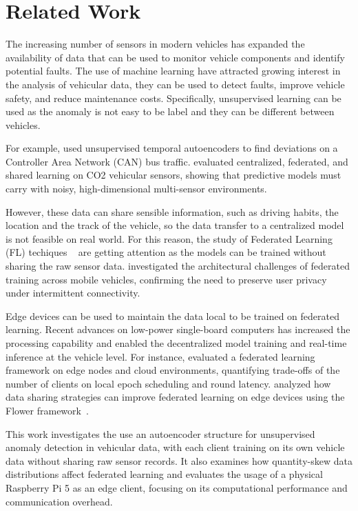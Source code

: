 \documentclass[12pt]{article}
\begin{document}
\section{Related Work}
\label{sec:RelatedWork}
 
 The increasing number of sensors in modern vehicles has expanded the availability of data that can be used to monitor vehicle components and identify potential faults. The use of machine learning have attracted growing interest in the analysis of vehicular data, they can be used to detect faults, improve vehicle safety, and reduce maintenance costs. Specifically, unsupervised learning can be used as the anomaly is not easy to be label and they can be different between vehicles. 
   
 For example, \cite{hanselmann2020canet} used unsupervised temporal autoencoders to find deviations on a Controller Area Network (CAN) bus traffic. \cite{braun2025which} evaluated centralized, federated, and shared learning on CO2 vehicular sensors, showing that predictive models must carry with noisy, high-dimensional multi-sensor environments.
 
 
 However, these data can share sensible information, such as driving habits, the location and the track of the vehicle, so the data transfer to a centralized model is not feasible on real world. For this reason, the study of Federated Learning (FL) techiques ~\cite{mcmahan2017communication} are getting attention as the models can be trained without sharing the raw sensor data. \cite{souza2024aprendizado} investigated the architectural challenges of federated training across mobile vehicles, confirming the need to preserve user privacy under intermittent connectivity.
 
 Edge devices can be used to maintain the data local to be trained on federated learning. Recent advances on low-power single-board computers has increased the processing capability and enabled the decentralized model training and real-time inference at the vehicle level. For instance, \cite{barbosa2025practical} evaluated a federated learning framework on edge nodes and cloud environments, quantifying trade-offs of the number of clients on local epoch scheduling and round latency.  \cite{oliveira2025data} analyzed how data sharing strategies can improve federated learning on edge devices using the Flower framework~\cite{beutel2020flower}.
 
This work investigates the use an autoencoder structure for unsupervised anomaly detection in vehicular data, with each client training on its own vehicle data without sharing raw sensor records. It also examines how quantity-skew data distributions affect federated learning and evaluates the usage of a physical Raspberry Pi 5 as an edge client, focusing on its computational performance and communication overhead.
\end{document}

